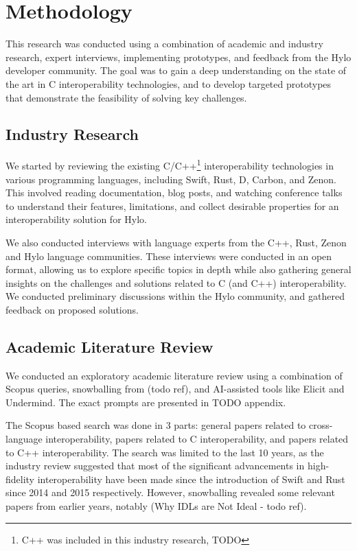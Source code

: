 \section{Methodology}
This research was conducted using a combination of academic and industry research, expert interviews, implementing prototypes, and feedback from the Hylo developer community. The goal was to gain a deep understanding on the state of the art in C interoperability technologies, and to develop targeted prototypes that demonstrate the feasibility of solving key challenges. 

\subsection{Industry Research}
We started by reviewing the existing C/C++\footnote{C++ was included in this industry research, TODO} interoperability technologies in various programming languages, including Swift, Rust, D, Carbon, and Zenon. This involved reading documentation, blog posts, and watching conference talks to understand their features, limitations, and collect desirable properties for an interoperability solution for Hylo.

We also conducted interviews with language experts from the C++, Rust, Zenon and Hylo language communities. These interviews were conducted in an open format, allowing us to explore specific topics in depth while also gathering general insights on the challenges and solutions related to C (and C++) interoperability. We conducted preliminary discussions within the Hylo community, and gathered feedback on proposed solutions.

\subsection{Academic Literature Review}
We conducted an exploratory academic literature review using a combination of Scopus queries, snowballing from (todo ref), and AI-assisted tools like Elicit and Undermind. The exact prompts are presented in TODO appendix.

The Scopus based search was done in 3 parts: general papers related to cross-language interoperability, papers related to C interoperability, and papers related to C++ interoperability. The search was limited to the last 10 years, as the industry review suggested that most of the significant advancements in high-fidelity interoperability have been made since the introduction of Swift and Rust since 2014 and 2015 respectively. However, snowballing revealed some relevant papers from earlier years, notably (Why IDLs are Not Ideal - todo ref).

